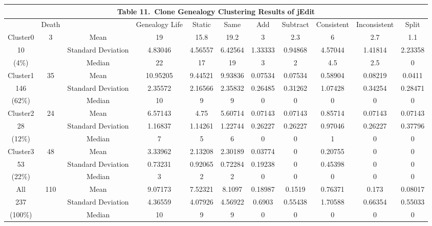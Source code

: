 {
\begin{table}[!htb]
\tabcolsep=2.5pt 
\scriptsize
\begin{center}
\begin{tabular}{|c|c|c|c|c|c|c|c|c|c|c|}
\multicolumn{11}{c}{\bf Table 11.\  Clone Genealogy Clustering Results of jEdit }\\ \hline
&Death&&Genealogy Life&	Static&	Same&	Add	&Subtract&	Consistent&	Inconsistent&	Split\\ \hline
Cluster0&\multirow{3}{*}{3}&Mean	&19	&15.8	&19.2	&3	&2.3&	6	&2.7&	1.1\\ \cline{3-11}
10&&Standard Deviation	&4.83046	&4.56557&	6.42564	&1.33333&	0.94868&	4.57044&	1.41814	&2.23358\\ \cline{3-11}
(4\%)&&Median	&22&	17&	19&	3&	2	&4.5	&2.5&	0\\ \hline
Cluster1&\multirow{3}{*}{35}&Mean	&10.95205&	9.44521&	9.93836&	0.07534	&0.07534	&0.58904&	0.08219&	0.0411\\ \cline{3-11}
146&&Standard Deviation&2.35572	&2.16566&2.35832	&0.26485	&0.31262&	1.07428&	0.34254&	0.28471\\ \cline{3-11}
(62\%)&&Median&	10&	9&	9	&0&	0	&0	&0&	0\\ \hline
Cluster2&\multirow{3}{*}{24}&Mean	&6.57143&	4.75&	5.60714&	0.07143&	0.07143&	0.85714&	0.07143&	0.07143\\ \cline{3-11}
28&&Standard Deviation	&1.16837&	1.14261	&1.22744	&0.26227&0.26227	&0.97046	&0.26227	&0.37796\\ \cline{3-11}
(12\%)&&Median	&7	&5	&6&	0	&0	&1&	0&	0\\ \hline
Cluster3&\multirow{3}{*}{48}&Mean	&3.33962&	2.13208&	2.30189&	0.03774&	0	&0.20755&	0	&0\\ \cline{3-11}
53&&Standard Deviation&	0.73231	&0.92065	&0.72284&	0.19238&	0&	0.45398	&0	&0\\ \cline{3-11}
(22\%)&&Median	&3&	2&	2	&0&	0&	0	&0&	0\\ \hline
All&\multirow{3}{*}{110}&Mean	&9.07173	&7.52321&	8.1097	&0.18987&	0.1519&	0.76371	&0.173&	0.08017\\ \cline{3-11}
237&&Standard Deviation	&4.36559&	4.07926	&4.56922	&0.6903&	0.55438&	1.70588	&0.66354	&0.55033\\ \cline{3-11}
(100\%)&&Median	&10	&9	&9	&0	&0	&0	&0	&0\\ \hline
\end{tabular}
\end{center}
\end{table}
}

